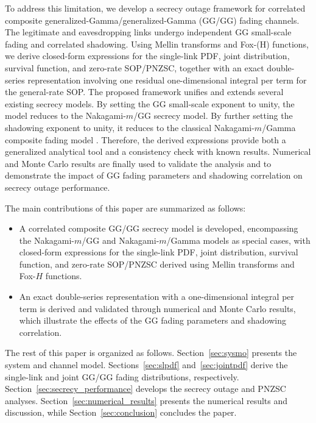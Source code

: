 \documentclass[lettersize,journal]{IEEEtran}
\begin{document}
To address this limitation, we develop a secrecy outage framework for correlated composite generalized-Gamma/generalized-Gamma (GG/GG) fading channels. The legitimate and eavesdropping links undergo independent GG small-scale fading and correlated shadowing. Using Mellin transforms and Fox-(H) functions, we derive closed-form expressions for the single-link PDF, joint distribution, survival function, and zero-rate SOP/PNZSC, together with an exact double-series representation involving one residual one-dimensional integral per term for the general-rate SOP. The proposed framework unifies and extends several existing secrecy models. By setting the GG small-scale exponent to unity, the model reduces to the Nakagami-\(m\)/GG secrecy model. By further setting the shadowing exponent to unity, it reduces to the classical Nakagami-\(m\)/Gamma composite fading model \cite{8060499}. Therefore, the derived expressions provide both a generalized analytical tool and a consistency check with known results. Numerical and Monte Carlo results are finally used to validate the analysis and to demonstrate the impact of GG fading parameters and shadowing correlation on secrecy outage performance.


The main contributions of this paper are summarized as follows:
\begin{itemize}
    \item A correlated composite GG/GG secrecy model is developed, encompassing the Nakagami-\(m\)/GG and Nakagami-\(m\)/Gamma models as special cases, with closed-form expressions for the single-link PDF, joint distribution, survival function, and zero-rate SOP/PNZSC derived using Mellin transforms and Fox-\(H\) functions.

    \item An exact double-series representation with a one-dimensional integral per term is derived and validated through numerical and Monte Carlo results, which illustrate the effects of the GG fading parameters and shadowing correlation.
\end{itemize}


The rest of this paper is organized as follows. Section~\ref{sec:sysmo} presents the system and channel model. Sections~\ref{sec:slpdf} and~\ref{sec:jointpdf} derive the single-link and joint GG/GG fading distributions, respectively. Section~\ref{sec:secrecy_performance} develops the secrecy outage and PNZSC analyses. Section~\ref{sec:numerical_results} presents the numerical results and discussion, while Section~\ref{sec:conclusion} concludes the paper.
\end{document}

